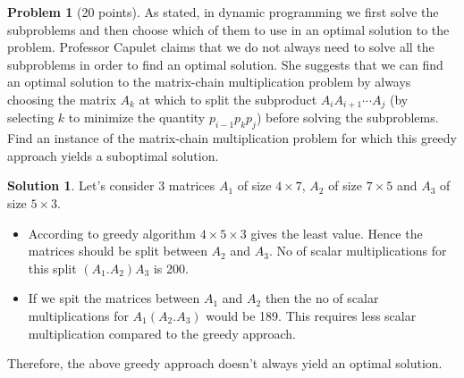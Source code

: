 \documentclass{article}
\theoremstyle{definition}
\newtheorem{problem}{Problem}
\newtheorem*{solution}{Solution}
\begin{document}
\begin{problem}[20 points]
  As stated, in dynamic programming we first solve the subproblems and
  then choose which of them to use in an optimal solution to the
  problem. Professor Capulet claims that we do not always need to
  solve all the subproblems in order to find an optimal solution. She
  suggests that we can find an optimal solution to the matrix-chain
  multiplication problem by always choosing the matrix $A_k$ at which
  to split the subproduct $A_iA_{i+1}\cdots A_j$ (by selecting $k$ to
  minimize the quantity $p_{i-1}p_kp_j$) before solving the
  subproblems. Find an instance of the matrix-chain multiplication
  problem for which this greedy approach yields a suboptimal solution.
\end{problem}
\begin{solution}
Let's consider 3 matrices $A_1$ of size $4\times7$, $A_2$ of size $7\times5$ and $A_3$ of size $5\times3$.
\begin{itemize}
    \item According to greedy algorithm $4 \times 5 \times 3$ gives the least value. Hence the matrices should be split between $A_2$ and $A_3$. No of scalar multiplications for this split $(A_1.A_2)A_3$ is 200.
    \item If we spit the matrices between $A_1$ and $A_2$ then the no of scalar multiplications for $A_1(A_2.A_3)$ would be 189. This requires less scalar multiplication compared to the greedy approach.
\end{itemize}
Therefore, the above greedy approach doesn't always yield an optimal solution.
\end{solution}
\newpage
\end{document}
